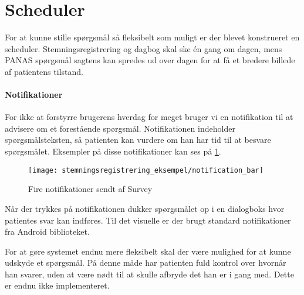 \section{Scheduler}
For at kunne stille spørgsmål så fleksibelt som muligt er der blevet konstrueret en scheduler.
Stemningsregistrering og dagbog skal ske én gang om dagen, mens PANAS spørgsmål sagtens kan spredes ud over dagen for at få et bredere billede af patientens tilstand.


\paragraph{Notifikationer}
For ikke at forstyrre brugerens hverdag for meget bruger vi en notifikation til at advisere om et forestående spørgsmål.
Notifikationen indeholder spørgsmålsteksten, så patienten kan vurdere om han har tid til at besvare spørgsmålet.
Eksempler på disse notifikationer kan ses på \cref{noti}.

\begin{figure}
	\centering
	\texttt{[image: stemningsregistrering\_eksempel/notification\_bar]}
	\caption{Fire notifikationer sendt af Survey}\label{noti}
\end{figure}

Når der trykkes på notifikationen dukker spørgsmålet op i en dialogboks hvor patientes svar kan indføres.
Til det visuelle er der brugt standard notifikationer fra Android biblioteket.\cite{android_notifications}

For at gøre systemet endnu mere fleksibelt skal der være mulighed for at kunne udskyde et spørgsmål.
På denne måde har patienten fuld kontrol over hvornår han svarer, uden at være nødt til at skulle afbryde det han er i gang med.
Dette er endnu ikke implementeret.